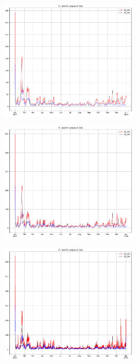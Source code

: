 \documentclass[12pt,a4paper,twoside]{scrartcl}
\numberwithin{equation}{section}
\begin{document}
\begin{figure}[H]
  \centering
  \begin{subfigure}[t]{0.32\textwidth}
    \includegraphics[width=\textwidth,height=6cm]{figures/1D_140_plot}%
    \caption{}
  \end{subfigure}
  \begin{subfigure}[t]{0.32\textwidth}
    \includegraphics[width=\textwidth,height=6cm]{figures/12H_140_plot}%
    \caption{}
  \end{subfigure}
  \begin{subfigure}[t]{0.32\textwidth}
    \includegraphics[width=\textwidth,height=6cm]{figures/1H_140_plot}%
    \caption{}
  \end{subfigure}


\end{figure}
\end{document}
